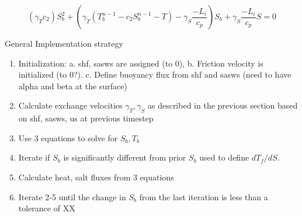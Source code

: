     \begin{equation}
	(\gamma_T c_2) S_b^2 + (\gamma_T(T_b^{n-1}-c_2 S_b^{n-1}-T)-\gamma_S \frac{-L_i}{c_p})S_b + \gamma_S\frac{-L_i}{c_p}S=0
	\end{equation}
	

	
	

	General Implementation strategy
	\begin{enumerate}
		\item Initialization: 
		a. shf, sasws are assigned (to 0), 
		b. Friction velocity is initialized (to 0?). 
		c. Define buoyancy flux from shf and sasws 
			(need to have alpha and beta at the surface)
		\item Calculate exchange velocities $\gamma_T,\gamma_S$ as described in the previous section based on shf, sasws, us at previous timestep
		\item Use 3 equations to solve for $S_b, T_b$
		\item Iterate if $S_b$ is significantly different from prior $S_b$ used to define $dT_f/dS$.
		\item Calculate heat, salt fluxes from 3 equations
		\item Iterate 2-5 until the change in $S_b$ from the last iteration is less than a tolerance of XX
	\end{enumerate}